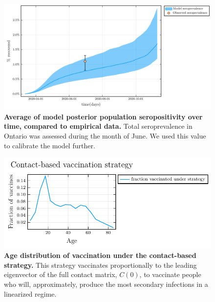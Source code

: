     \begin{figure}[H]
    \centering
    \includegraphics[width = 12 cm]{appendices/FigureS5.pdf}
    \caption{\textbf{Average of model posterior population seropositivity over time, compared to empirical data.} Total seroprevalence in Ontario was assessed during the month of June. We used this value to calibrate the model further.  }
    \label{plot_model}
    \end{figure}
    
    \clearpage 
    
    \begin{figure}[H]
    \centering
    \includegraphics[width = 12 cm]{appendices/FigureS6.pdf}
    \caption{\textbf{Age distribution of vaccination under the contact-based strategy.} This strategy vaccinates proportionally to the leading eigenvector of the full contact matrix, $C(0)$, to vaccinate people who will, approximately, produce the most secondary infections in a linearized regime.}
    \label{plot_model}
    \end{figure}
    
    \clearpage 
    
